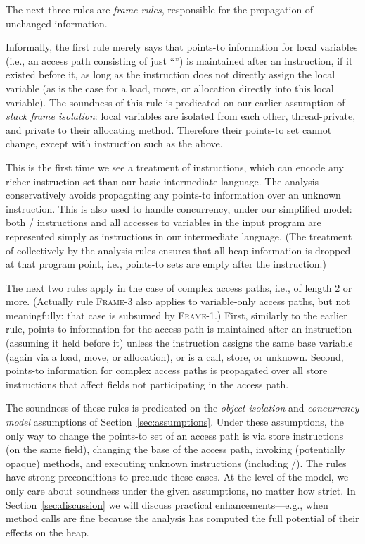 The next three rules are \emph{frame rules}, responsible for the
propagation of unchanged information.  

Informally, the first rule merely says that points-to information for
local variables (i.e., an access path consisting of just
``'') is maintained after an instruction, if it existed
before it, as long as the instruction does not directly assign the
local variable (as is the case for a load, move, or allocation
directly into this local variable). The soundness of this rule is
predicated on our earlier assumption of \emph{stack frame isolation}:
local variables are isolated from each other, thread-private, and
private to their allocating method. Therefore their points-to set
cannot change, except with instruction such as the above.

This is the first time we see a treatment of \unknowninstr{}
instructions, which can encode any richer instruction set than our
basic intermediate language. The analysis conservatively avoids
propagating any points-to information over an unknown instruction.
This is also used to handle concurrency, under our simplified model:
both / instructions and all accesses
to  variables in the input program are represented simply
as \unknowninstr{} instructions in our intermediate language. (The
treatment of \unknowninstr{} collectively by the analysis rules
ensures that all heap information is dropped at that program point,
i.e., points-to sets are empty after the instruction.)

The next two rules apply in the case of complex access paths, i.e., of
length 2 or more. (Actually rule \textsc{Frame-3} also applies to
variable-only access paths, but not meaningfully: that case is
subsumed by \textsc{Frame-1}.) First, similarly to the earlier rule,
points-to information for the access path is maintained after an
instruction (assuming it held before it) unless the instruction
assigns the same base variable (again via a load, move, or
allocation), or is a call, store, or unknown.  Second, points-to
information for complex access paths is propagated over all store
instructions that affect fields not participating in the access path.

The soundness of these rules is predicated on the \emph{object
  isolation} and \emph{concurrency model} assumptions of
Section~\ref{sec:assumptions}. Under these assumptions, the only way
to change the points-to set of an access path is via store
instructions (on the same field), changing the base of the access
path, invoking (potentially opaque) methods, and executing unknown
instructions (including /). The rules
have strong preconditions to preclude these cases. At the level of the
model, we only care about soundness under the given assumptions, no
matter how strict.  In Section~\ref{sec:discussion} we will discuss
practical enhancements---e.g., when method calls are fine because the
analysis has computed the full potential of their effects on the heap.

